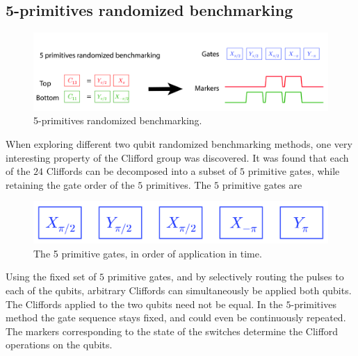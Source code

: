       \subsection{5-primitives randomized benchmarking}
        \label{ssec:5-primitives randomized benchmarking}

        \begin{figure}[h]
          \centering
          \includegraphics[width=\textwidth]{Figures/Randomized benchmarking/5 primitives RB.jpg}
          \caption{5-primitives randomized benchmarking.}
          \label{fig:5-primitives RB schematic}
        \end{figure}

        When exploring different two qubit randomized benchmarking methods, one very interesting property of the Clifford group was discovered. It was found that each of the $24$ Cliffords can be decomposed into a subset of $5$ primitive gates, while retaining the gate order of the $5$ primitives. The $5$ primitive gates are

        \begin{figure}[h!]
          \centering
          \includegraphics[width=.5\textwidth]{Figures/Randomized benchmarking/5 primitive gates.jpg}
          \caption{The 5 primitive gates, in order of application in time.}
          \label{5 primitive gates}
        \end{figure}

        Using the fixed set of $5$ primitive gates, and by selectively routing the pulses to each of the qubits, arbitrary Cliffords can simultaneously be applied both qubits. The Cliffords applied to the two qubits need not be equal. In the $5$-primitives method the gate sequence stays fixed, and could even be continuously repeated. The markers corresponding to the state of the switches determine the Clifford operations on the qubits.

